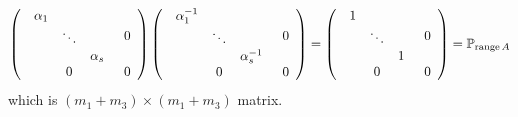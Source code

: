 \begin{equation}
\left( 
\begin{array}{cc}
\begin{array}{ccc}
\alpha _{1} &  &  \\ 
& \ddots &  \\ 
&  & \alpha _{s}%
\end{array}
& 0 \\ 
0 & 0%
\end{array}%
\right) \left( 
\begin{array}{cc}
\begin{array}{ccc}
\alpha _{1}^{-1} &  &  \\ 
& \ddots &  \\ 
&  & \alpha _{s}^{-1}%
\end{array}
& 0 \\ 
0 & 0%
\end{array}%
\right) =\left( 
\begin{array}{cc}
\begin{array}{ccc}
1 &  &  \\ 
& \ddots &  \\ 
&  & 1%
\end{array}
& 0 \\ 
0 & 0%
\end{array}%
\right) ={\Bbb P}_{%
\mathop{\rm range}%
A}
\end{equation}%
which is $\left( m_{1}+m_{3}\right) \times \left( m_{1}+m_{3}\right) $
matrix.

